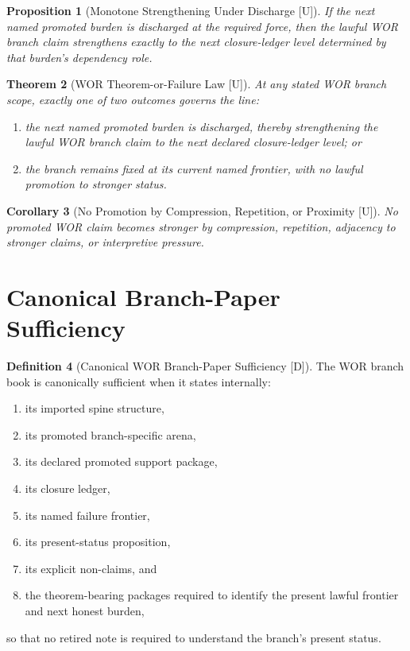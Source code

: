 \documentclass[11pt]{article}
\newtheorem{theorem}{Theorem}[section]
\newtheorem{proposition}[theorem]{Proposition}
\newtheorem{corollary}[theorem]{Corollary}
\theoremstyle{definition}
\newtheorem{definition}[theorem]{Definition}
\theoremstyle{remark}
\newcommand{\U}{\textnormal{[U]}}
\newcommand{\D}{\textnormal{[D]}}
\begin{document}
\begin{proposition}[Monotone Strengthening Under Discharge {\U}]
If the next named promoted burden is discharged at the required force, then the lawful WOR branch claim strengthens exactly to the next closure-ledger level determined by that burden’s dependency role.
\end{proposition}

\begin{theorem}[WOR Theorem-or-Failure Law {\U}]
At any stated WOR branch scope, exactly one of two outcomes governs the line:
\begin{enumerate}[label=(\arabic*)]
    \item the next named promoted burden is discharged, thereby strengthening the lawful WOR branch claim to the next declared closure-ledger level; or
    \item the branch remains fixed at its current named frontier, with no lawful promotion to stronger status.
\end{enumerate}
\end{theorem}

\begin{corollary}[No Promotion by Compression, Repetition, or Proximity {\U}]
No promoted WOR claim becomes stronger by compression, repetition, adjacency to stronger claims, or interpretive pressure.
\end{corollary}

\section{Canonical Branch-Paper Sufficiency}

\begin{definition}[Canonical WOR Branch-Paper Sufficiency {\D}]
The WOR branch book is canonically sufficient when it states internally:
\begin{enumerate}[label=(\arabic*)]
    \item its imported spine structure,
    \item its promoted branch-specific arena,
    \item its declared promoted support package,
    \item its closure ledger,
    \item its named failure frontier,
    \item its present-status proposition,
    \item its explicit non-claims, and
    \item the theorem-bearing packages required to identify the present lawful frontier and next honest burden,
\end{enumerate}
so that no retired note is required to understand the branch’s present status.
\end{definition}
\end{document}
